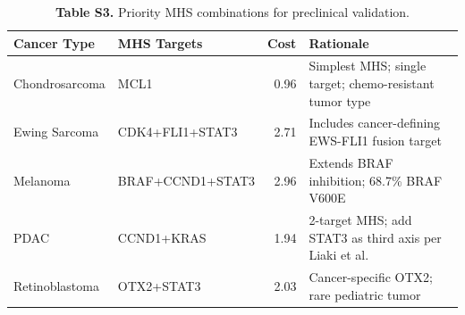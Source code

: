 \documentclass[11pt]{article}
\begin{document}
\begin{table}[htbp]
\centering
\caption{\textbf{Table S3.} Priority MHS combinations for preclinical validation.}
\scriptsize
\setlength{\tabcolsep}{4pt}
\begin{tabular}{@{}p{2.2cm}lrp{6.8cm}@{}}
\toprule
\textbf{Cancer Type} & \textbf{MHS Targets} & \textbf{Cost} & \textbf{Rationale} \\
\midrule
Chondrosarcoma & MCL1 & 0.96 & Simplest MHS; single target; chemo-resistant tumor type \\
Ewing Sarcoma & CDK4+FLI1+STAT3 & 2.71 & Includes cancer-defining EWS-FLI1 fusion target \\
Melanoma & BRAF+CCND1+STAT3 & 2.96 & Extends BRAF inhibition; 68.7\% BRAF V600E \\
PDAC & CCND1+KRAS & 1.94 & 2-target MHS; add STAT3 as third axis per Liaki et al. \\
Retinoblastoma & OTX2+STAT3 & 2.03 & Cancer-specific OTX2; rare pediatric tumor \\
\bottomrule
\end{tabular}
\normalsize
\end{table}
\end{document}
